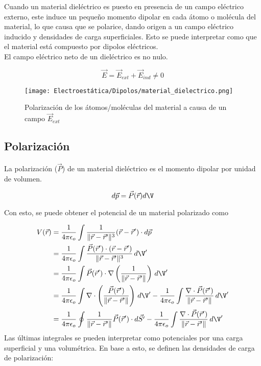 Cuando un material dieléctrico es puesto en presencia de un campo eléctrico externo, este induce un pequeño momento dipolar en cada átomo o molécula del material, lo que causa que se polarice, dando origen a un campo eléctrico inducido y densidades de carga superficiales. Esto se puede interpretar como que el material está compuesto por dipolos eléctricos.\\

El campo eléctrico neto de un dieléctrico es no nulo.

\[\Vec{E} = \Vec{E}_{ext}+\Vec{E}_{ind} \neq 0\]

\begin{figure}[H]
    \centering
    \texttt{[image: Electroestática/Dipolos/material\_dielectrico.png]}
    \caption*{Polarización de los átomos/moléculas del material a causa de un campo $\Vec{E}_{ext}$}
\end{figure}

\subsection{Polarización}

La polarización ($\Vec{P}$) de un material dieléctrico es el momento dipolar por unidad de volumen.

\[d\Vec{p}=\Vec{P}(\Vec{r})d\V\]

Con esto, se puede obtener el potencial de un material polarizado como

\begin{equation}
\begin{split}
    V(\Vec{r}) &= \frac{1}{4\pi\epsilon_o}\int
    \frac{1}{\|\Vec{r}-\Vec{r}'\|^3}(\Vec{r}-\Vec{r}')
    \cdot d\Vec{p}\\
    &= \frac{1}{4\pi\epsilon_o}\int
    \frac{\Vec{P}(\Vec{r}')\cdot(\Vec{r}-\Vec{r}')}{\|\Vec{r}-\Vec{r}'\|^3}\,d\V'\\
    &= \frac{1}{4\pi\epsilon_o}\int\Vec{P}(\Vec{r}')\cdot
    \nabla\left(\frac{1}{\|\Vec{r}-\Vec{r}'\|}\right)\,d\V'\\
    &= \frac{1}{4\pi\epsilon_o}\int\nabla\cdot\left(
    \frac{\Vec{P}(\Vec{r}')}{\|\Vec{r}-\Vec{r}'\|}\right)\,d\V'-\frac{1}{4\pi\epsilon_o}\int
    \frac{\nabla\cdot\Vec{P}(\Vec{r}')}{\|\Vec{r}-\Vec{r}'\|}
    \,d\V'\\
    &= \frac{1}{4\pi\epsilon_o}\oint
    \frac{1}{\|\Vec{r}-\Vec{r}'\|}
    \Vec{P}(\Vec{r}')\cdot d\Vec{S'}-\frac{1}{4\pi\epsilon_o}\int
    \frac{\nabla\cdot\Vec{P}(\Vec{r}')}{\|\Vec{r}-\Vec{r}'\|}
    \,d\V'\\
\end{split}
\nonumber
\end{equation}
\bigbreak
Las últimas integrales se pueden interpretar como potenciales por una carga superficial y una volumétrica. En base a esto, se definen las densidades de carga de polarización:

